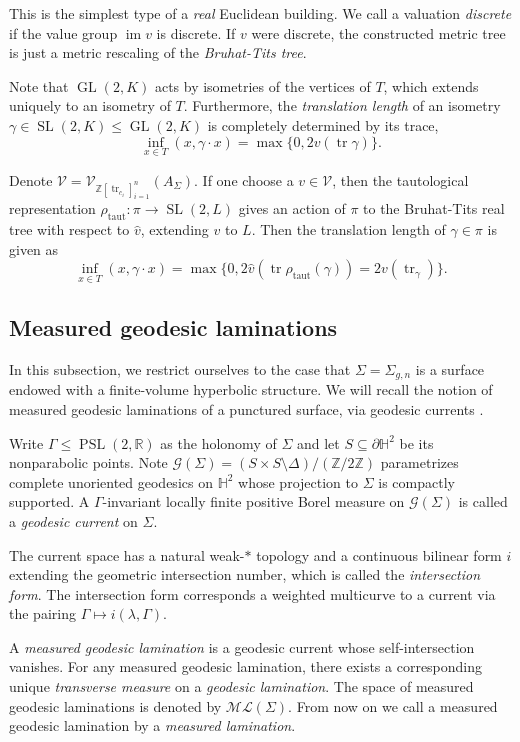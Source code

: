 \documentclass[11pt]{amsart}
\numberwithin{theorem}{section}
\theoremstyle{definition}
\theoremstyle{remark}
\renewcommand{\H}{{\mathbb{H}}}
\newcommand{\R}{{\mathbb{R}}}
\newcommand{\Z}{{\mathbb{Z}}}
\newcommand{\Gcal}{{\mathcal{G}}}
\newcommand{\Vcal}{{\mathcal{V}}}
\DeclareMathOperator{\GL}{GL}
\DeclareMathOperator{\img}{im}
\DeclareMathOperator{\PSL}{PSL}
\DeclareMathOperator{\SL}{SL}
\DeclareMathOperator{\tr}{tr}
\newcommand{\<}{\langle}
\renewcommand{\>}{\rangle}
\begin{document}
This is the simplest type of a \textit{real} Euclidean building. We call a valuation \textit{discrete} if the value group $\img v$ is discrete. If $v$ were discrete, the constructed metric tree is just a metric rescaling of the \textit{Bruhat-Tits tree}.

Note that $\GL(2, K)$ acts by isometries of the vertices of $T$, which extends uniquely to an isometry of $T$. Furthermore, the \textit{translation length} of an isometry $\gamma \in \SL(2, K) \leq \GL(2, K)$ is completely determined by its trace,
\[
\inf_{x \in T}(x, \gamma \cdot x) = \max\{0, 2 v(\tr \gamma)\}.
\]


Denote $\Vcal = \Vcal_{\Z[\tr_{c_i}]_{i=1}^n}(A_\Sigma) $. If one choose a $v \in \Vcal$, then the tautological representation $\rho_{\text{taut}} : \pi \rightarrow \SL(2, L)$ gives an action of $\pi$ to the Bruhat-Tits real tree with respect to $\hat{v}$, extending $v$ to $L$. Then the translation length of $\gamma \in \pi$ is given as
\[
\inf_{x \in T}(x, \gamma \cdot x) = \max\{0, 2 \hat{v}(\tr \rho_{\text{taut}}(\gamma)) = 2 v (\tr_\gamma) \}.
\]



\subsection{Measured geodesic laminations}

In this subsection, we restrict ourselves to the case that $\Sigma = \Sigma_{g, n}$ is a surface endowed with a finite-volume hyperbolic structure. We will recall the notion of measured geodesic laminations of a punctured surface, via geodesic currents \cite{bonahon1988geometry, lindenstrauss2008ergodic}. 

Write $\Gamma \leq \PSL(2, \R)$ as the holonomy of $\Sigma$ and let $S \subseteq \partial \H^2$ be its nonparabolic points. Note $\Gcal(\Sigma) = (S \times S \setminus \Delta) / (\Z/2\Z)$ parametrizes complete unoriented geodesics on $\H^2$ whose projection to $\Sigma$ is compactly supported. A $\Gamma$-invariant locally finite positive Borel measure on $\Gcal(\Sigma)$ is called a \textit{geodesic current} on $\Sigma$. 

The current space has a natural weak-$*$ topology and a continuous bilinear form $i$ extending the geometric intersection number, which is called the \textit{intersection form}. The intersection form corresponds a weighted multicurve to a current via the pairing $\Gamma \mapsto i(\lambda,\Gamma)$.

A \textit{measured geodesic lamination} is a geodesic current whose self-intersection vanishes. For any measured geodesic lamination, there exists a corresponding unique \textit{transverse measure} on a \textit{geodesic lamination}. The space of measured geodesic laminations is denoted by $\mathcal{ML}(\Sigma)$. From now on we call a measured geodesic lamination by a \textit{measured lamination}.
\end{document}
